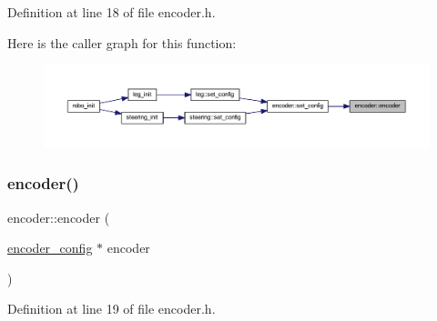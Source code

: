 Definition at line 18 of file encoder.\+h.

Here is the caller graph for this function\+:
\nopagebreak
\begin{figure}[H]
\begin{center}
\leavevmode
\includegraphics[width=350pt]{classencoder_af19dfa89c07692c0b1da8f24aec3d52d_icgraph}
\end{center}
\end{figure}
\mbox{\label{classencoder_a074f819c70398da9ce1af632dc391a19}} 
\subsubsection{\texorpdfstring{encoder()}{encoder()}\hspace{0.1cm}{\footnotesize\ttfamily [2/4]}}
{\footnotesize\ttfamily encoder\+::encoder (\begin{DoxyParamCaption}\item[{\mbox{\hyperlink{structencoder__config}{encoder\+\_\+config}} $\ast$}]{encoder }\end{DoxyParamCaption})\hspace{0.3cm}{\ttfamily [inline]}}



Definition at line 19 of file encoder.\+h.

